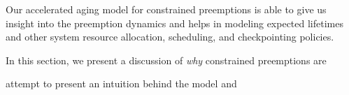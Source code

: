 
% 

Our accelerated aging model for constrained preemptions is able to give us insight into the preemption dynamics and helps in modeling expected lifetimes and other system resource allocation, scheduling, and checkpointing policies.

In this section, we present a discussion of \emph{why} constrained preemptions are

attempt to present an intuition behind the model and 

